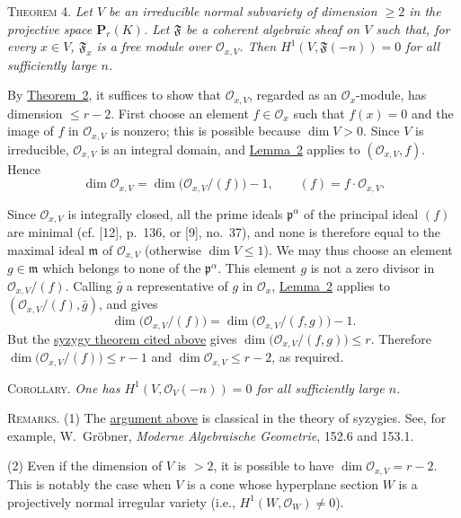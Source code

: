 \label{fac:III:5:no:76:thm:4}
\textsc{Theorem 4.} \textit{Let $V$ be an irreducible normal subvariety
of dimension $\geq2$ in the projective space $\mathbf P_r(K)$. Let
$\mathfrak F$ be a coherent algebraic sheaf on $V$ such that, for every
$x\in V$, $\mathfrak F_x$ is a free module over $\mathcal O_{x,V}$.
Then $H^1(V,\mathfrak F(-n))=0$ for all sufficiently large $n$.}

\label{fac:III:5:no:76:thm:4:proof}
By \hyperref[fac:III:5:no:74:thm:2]{Theorem~2}, it suffices to show that
$\mathcal O_{x,V}$, regarded as an $\mathcal O_x$-module, has dimension
$\leq r-2$. First choose an element $f\in\mathcal O_x$ such that
$f(x)=0$ and the image of $f$ in $\mathcal O_{x,V}$ is nonzero; this is
possible because $\dim V>0$. Since $V$ is irreducible,
$\mathcal O_{x,V}$ is an integral domain, and
\hyperref[fac:III:5:no:76:lemma:2]{Lemma~2} applies to
$(\mathcal O_{x,V},f)$. Hence
\label{fac:III:5:no:76:formula:first-dimension-step}
\[
\dim\mathcal O_{x,V}=\dim\bigl(\mathcal O_{x,V}/(f)\bigr)-1,
\qquad (f)=f\cdot\mathcal O_{x,V}.
\]

Since $\mathcal O_{x,V}$ is integrally closed, all the prime ideals
$\mathfrak p^\alpha$ of the principal ideal $(f)$ are minimal
(cf. [12], p.~136, or [9], no.~37), and none is therefore equal to the
maximal ideal $\mathfrak m$ of $\mathcal O_{x,V}$ (otherwise
$\dim V\leq1$). We may thus choose an element $g\in\mathfrak m$ which
belongs to none of the $\mathfrak p^\alpha$. This element $g$ is not a
zero divisor in $\mathcal O_{x,V}/(f)$. Calling $\bar g$ a representative
of $g$ in $\mathcal O_x$, \hyperref[fac:III:5:no:76:lemma:2]{Lemma~2} applies to
$(\mathcal O_{x,V}/(f),\bar g)$, and gives
\label{fac:III:5:no:76:formula:second-dimension-step}
\[
\dim\bigl(\mathcal O_{x,V}/(f)\bigr)
=\dim\bigl(\mathcal O_{x,V}/(f,g)\bigr)-1.
\]
But the \hyperref[fac:III:5:no:74:syzygy-bound]{syzygy theorem cited above} gives
$\dim\bigl(\mathcal O_{x,V}/(f,g)\bigr)\leq r$. Therefore
$\dim\bigl(\mathcal O_{x,V}/(f)\bigr)\leq r-1$ and
$\dim\mathcal O_{x,V}\leq r-2$, as required.

\label{fac:III:5:no:76:cor}
\textsc{Corollary.} \textit{One has
$H^1(V,\mathcal O_V(-n))=0$ for all sufficiently large $n$.}

\label{fac:III:5:no:76:remark:1}
\textsc{Remarks.} (1) The
\hyperref[fac:III:5:no:76:thm:4:proof]{argument above} is classical in the theory of
syzygies. See, for example, W.~Gröbner, \textit{Moderne Algebraische
Geometrie}, 152.6 and 153.1.

\label{fac:III:5:no:76:remark:2}
(2) Even if the dimension of $V$ is $>2$, it is possible to have
$\dim\mathcal O_{x,V}=r-2$. This is notably the case when $V$ is a cone
whose hyperplane section $W$ is a projectively normal irregular
variety (i.e., $H^1(W,\mathcal O_W)\neq0$).
